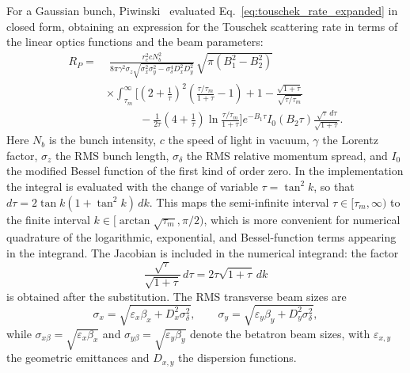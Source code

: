 For a Gaussian bunch, Piwinski~\cite{Piwinski:TouschekEffect} evaluated
Eq.~\eqref{eq:touschek_rate_expanded} in closed form, obtaining an expression for
the Touschek scattering rate in terms of the linear optics functions and the beam
parameters:
\begin{equation}
    \begin{aligned}
        R_P = &
        \; \frac{r_e^2 c N_b^2}{8 \pi \gamma^2 \sigma_z
        \sqrt{\sigma_x^2 \sigma_y^2 - \sigma_\delta^4 D_x^2 D_y^2}}
        \, \sqrt{\pi (B_1^2 - B_2^2)} \, \\
        & \times \int_{\tau_m}^{\infty}
        \Bigg[
        \left( 2 + \frac{1}{\tau} \right)^2
        \left( \frac{\tau / \tau_m}{1 + \tau} - 1 \right)
        + 1
        - \frac{\sqrt{1 + \tau}}{\sqrt{\tau / \tau_m}} \\
        & \qquad\quad - \frac{1}{2\tau}
        \left( 4 + \frac{1}{\tau} \right)
        \ln \frac{\tau / \tau_m}{1 + \tau}
        \Bigg]
        e^{-B_1 \tau} I_0 (B_2 \tau)
        \frac{\sqrt{\tau} \, d\tau}{\sqrt{1 + \tau}} .
    \end{aligned}
    \label{eq:touschek_piwinski_rate}
\end{equation}
Here $N_b$ is the bunch intensity, $c$ the speed of light in vacuum, $\gamma$
the Lorentz factor, $\sigma_z$ the RMS bunch length, $\sigma_\delta$ the RMS
relative momentum spread, and $I_0$ the modified Bessel function of the first
kind of order zero. In the implementation the integral is evaluated with the
change of variable $\tau=\tan^2 k$, so that
$d\tau=2\tan k(1+\tan^2 k)\,dk$. This maps the semi-infinite
interval $\tau\in[\tau_m,\infty)$ to the finite interval
$k\in[\arctan\sqrt{\tau_m},\pi/2)$, which is more convenient for numerical
quadrature of the logarithmic, exponential, and Bessel-function terms appearing
in the integrand. The Jacobian is included in the numerical integrand: the
factor
\[
    \frac{\sqrt{\tau}}{\sqrt{1+\tau}}\,d\tau
    =
    2\tau\sqrt{1+\tau}\,dk
\]
is obtained after the substitution. The RMS transverse beam sizes are
\begin{equation}
    \sigma_x = \sqrt{\varepsilon_x \beta_x + D_x^2 \sigma_\delta^2},
    \qquad
    \sigma_y = \sqrt{\varepsilon_y \beta_y + D_y^2 \sigma_\delta^2},
    \label{eq:touschek_beam_sizes}
\end{equation}
while $\sigma_{x\beta} = \sqrt{\varepsilon_x \beta_x}$ and
$\sigma_{y\beta} = \sqrt{\varepsilon_y \beta_y}$ denote the betatron beam sizes,
with $\varepsilon_{x,y}$ the geometric emittances and $D_{x,y}$ the dispersion
functions.

